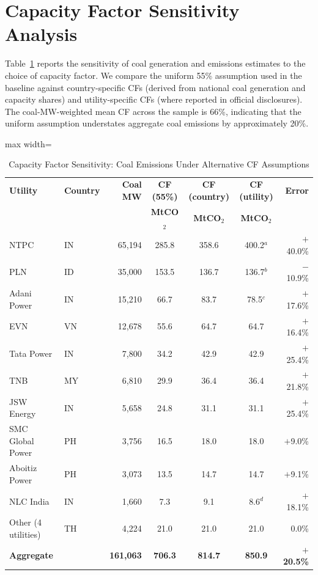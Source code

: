 \documentclass[review,3p,authoryear]{elsarticle}
\begin{document}
\section{Capacity Factor Sensitivity Analysis}
\label{app:cf_sensitivity}

Table~\ref{tab:cf_sensitivity} reports the sensitivity of coal generation and emissions estimates to the choice of capacity factor. We compare the uniform 55\% assumption used in the baseline against country-specific CFs (derived from national coal generation and capacity shares) and utility-specific CFs (where reported in official disclosures). The coal-MW-weighted mean CF across the sample is 66\%, indicating that the uniform assumption understates aggregate coal emissions by approximately 20\%.

\begin{table}[H]
\centering
\caption{Capacity Factor Sensitivity: Coal Emissions Under Alternative CF Assumptions}
\label{tab:cf_sensitivity}
\small
\begin{adjustbox}{max width=\linewidth}
\begin{tabular}{@{}llrcccr@{}}
\toprule
\textbf{Utility} & \textbf{Country} & \textbf{Coal MW} & \textbf{CF (55\%)} & \textbf{CF (country)} & \textbf{CF (utility)} & \textbf{Error} \\
 & & & \textbf{MtCO$_2$} & \textbf{MtCO$_2$} & \textbf{MtCO$_2$} & \\
\midrule
NTPC & IN & 65,194 & 285.8 & 358.6 & 400.2$^{a}$ & $+$40.0\% \\
PLN & ID & 35,000 & 153.5 & 136.7 & 136.7$^{b}$ & $-$10.9\% \\
Adani Power & IN & 15,210 & 66.7 & 83.7 & 78.5$^{c}$ & $+$17.6\% \\
EVN & VN & 12,678 & 55.6 & 64.7 & 64.7 & $+$16.4\% \\
Tata Power & IN & 7,800 & 34.2 & 42.9 & 42.9 & $+$25.4\% \\
TNB & MY & 6,810 & 29.9 & 36.4 & 36.4 & $+$21.8\% \\
JSW Energy & IN & 5,658 & 24.8 & 31.1 & 31.1 & $+$25.4\% \\
SMC Global Power & PH & 3,756 & 16.5 & 18.0 & 18.0 & $+$9.0\% \\
Aboitiz Power & PH & 3,073 & 13.5 & 14.7 & 14.7 & $+$9.1\% \\
NLC India & IN & 1,660 & 7.3 & 9.1 & 8.6$^{d}$ & $+$18.1\% \\
Other (4 utilities) & TH & 4,224 & 21.0 & 21.0 & 21.0 & 0.0\% \\
\midrule
\textbf{Aggregate} & & \textbf{161,063} & \textbf{706.3} & \textbf{814.7} & \textbf{850.9} & $+$\textbf{20.5\%} \\

\end{tabular}
\end{adjustbox}
\end{table}
\end{document}

